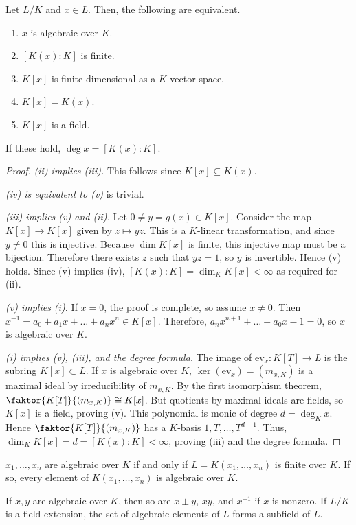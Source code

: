 \begin{proposition}
	Let \( L / K \) and \( x \in L \).
	Then, the following are equivalent.
	\begin{enumerate}
		\item \( x \) is algebraic over \( K \).
		\item \( [K(x):K] \) is finite.
		\item \( K[x] \) is finite-dimensional as a \( K \)-vector space.
		\item \( K[x] = K(x) \).
		\item \( K[x] \) is a field.
	\end{enumerate}
	If these hold, \( \deg x = [K(x):K] \).
\end{proposition}
\begin{proof}
	\emph{(ii) implies (iii).} This follows since \( K[x] \subseteq K(x) \).

	\emph{(iv) is equivalent to (v)} is trivial.

	\emph{(iii) implies (v) and (ii).}
	Let \( 0 \neq y = g(x) \in K[x] \).
	Consider the map \( K[x] \to K[x] \) given by \( z \mapsto yz \).
	This is a \( K \)-linear transformation, and since \( y \neq 0 \) this is injective.
	Because \( \dim K[x] \) is finite, this injective map must be a bijection.
	Therefore there exists \( z \) such that \( yz = 1 \), so \( y \) is invertible.
	Hence (v) holds.
	Since (v) implies (iv), \( [K(x):K] = \dim_K K[x] < \infty \) as required for (ii).

	\emph{(v) implies (i).}
	If \( x = 0 \), the proof is complete, so assume \( x \neq 0 \).
	Then \( x^{-1} = a_0 + a_1 x + \dots + a_n x^n \in K[x] \).
	Therefore, \( a_n x^{n+1} + \dots + a_0 x - 1 = 0 \), so \( x \) is algebraic over \( K \).

	\emph{(i) implies (v), (iii), and the degree formula.}
	The image of \( \mathrm{ev}_x \colon K[T] \to L \) is the subring \( K[x] \subset L \).
	If \( x \) is algebraic over \( K \), \( \ker(\mathrm{ev}_x) = (m_{x,K}) \) is a maximal ideal by irreducibility of \( m_{x,K} \).
	By the first isomorphism theorem, \( \faktor{K[T]}{(m_{x,K})} \cong K[x] \).
	But quotients by maximal ideals are fields, so \( K[x] \) is a field, proving (v).
	This polynomial is monic of degree \( d = \deg_K x \).
	Hence \( \faktor{K[T]}{(m_{x,K})} \) has a \( K \)-basis \( 1, T, \dots, T^{d-1} \).
	Thus, \( \dim_K K[x] = d = [K(x):K] < \infty \), proving (iii) and the degree formula.
\end{proof}
\begin{corollary}
	\( x_1, \dots, x_n \) are algebraic over \( K \) if and only if \( L = K(x_1, \dots, x_n) \) is finite over \( K \).
	If so, every element of \( K(x_1, \dots, x_n) \) is algebraic over \( K \).

	If \( x, y \) are algebraic over \( K \), then so are \( x \pm y \), \( xy \), and \( x^{-1} \) if \( x \) is nonzero.
	If \( L / K \) is a field extension, the set of algebraic elements of \( L \) forms a subfield of \( L \).
\end{corollary}
